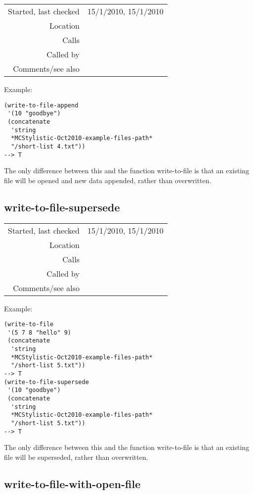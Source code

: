 \vspace{0.3cm}
\begin{tabular}{r|p{8cm}}
Started, last checked & 15/1/2010, 15/1/2010 \\
Location & \nameref{sec:text-files} \\
Calls & \\
Called by & \\
Comments/see also &
\end{tabular}

\vspace{0.5cm}
\noindent Example:
\begin{verbatim}
(write-to-file-append
 '(10 "goodbye")
 (concatenate
  'string
  *MCStylistic-Oct2010-example-files-path*
  "/short-list 4.txt"))
--> T
\end{verbatim}

\noindent The only difference between this and the
function write-to-file is that an existing file will
be opened and new data appended, rather than
overwritten.


\subsection*{write-to-file-supersede}\label{fun:write-to-file-supersede}

\vspace{0.3cm}
\begin{tabular}{r|p{8cm}}
Started, last checked & 15/1/2010, 15/1/2010 \\
Location & \nameref{sec:text-files} \\
Calls & \nameref{fun:write-to-file} \\
Called by & \\
Comments/see also &
\end{tabular}

\vspace{0.5cm}
\noindent Example:
\begin{verbatim}
(write-to-file
 '(5 7 8 "hello" 9)
 (concatenate
  'string
  *MCStylistic-Oct2010-example-files-path*
  "/short-list 5.txt"))
--> T
(write-to-file-supersede
 '(10 "goodbye")
 (concatenate
  'string
  *MCStylistic-Oct2010-example-files-path*
  "/short-list 5.txt"))
--> T
\end{verbatim}

\noindent The only difference between this and the
function write-to-file is that an existing file will
be superseded, rather than overwritten.


\subsection*{write-to-file-with-open-file}\label{fun:write-to-file-with-open-file}

